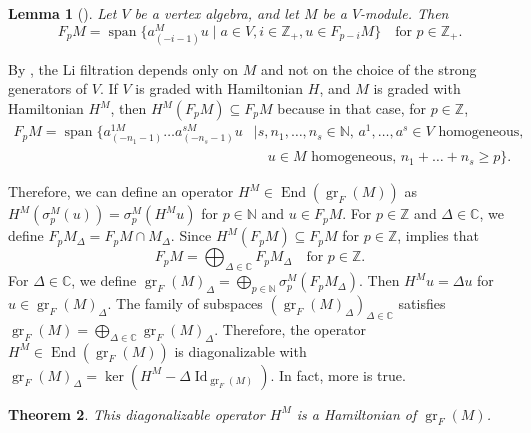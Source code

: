 \documentclass[a4paper, 12pt, reqno]{amsart}
\newtheorem{theorem}{Theorem}[section]
\newtheorem{lemma}[theorem]{Lemma}
\theoremstyle{remark}
\DeclareMathOperator{\Id}{Id}
\DeclareMathOperator{\gr}{gr}
\DeclareMathOperator{\End}{End}
\DeclareMathOperator{\vspan}{span}
\begin{document}
\begin{lemma}[{\cite[Lemma 2.9]{li_abelianizing_2005}}]
  \label{lmm:24}
  Let $V$ be a vertex algebra, and let $M$ be a $V$-module.
  Then
  \begin{equation*}
    F_pM = \vspan\{a^M_{(-i - 1)}u \mid a \in V, i \in \mathbb{Z}_+, u \in F_{p - i}M\} \quad \text{for $p \in \mathbb{Z}_+$}.
  \end{equation*}
\end{lemma}

By , the Li filtration depends only on $M$ and not on the choice of the strong generators of $V$.
If $V$ is graded with Hamiltonian $H$, and $M$ is graded with Hamiltonian $H^M$, then $H^M(F_pM) \subseteq F_pM$ because in that case, for $p \in \mathbb{Z}$,
\begin{equation*}
  \begin{split}
    F_pM = \vspan\{a^{1M}_{(-n_1 - 1)}\dots a^{sM}_{(-n_s - 1)}u &\mid \text{$s, n_1, \dots, n_s \in \mathbb{N}$, $a^1, \dots, a^s \in V$ homogeneous,} \\
                                                                 &\quad \text{$u \in M$ homogeneous, $n_1 + \dots + n_s \ge p$}\}.
  \end{split}
\end{equation*}

Therefore, we can define an operator $H^M \in \End(\gr_F(M))$ as $H^M(\sigma^M_p(u)) = \sigma^M_p(H^Mu)$ for $p \in \mathbb{N}$ and $u \in F_pM$.
For $p \in \mathbb{Z}$ and $\Delta \in \mathbb{C}$, we define $F_pM_{\Delta} = F_pM \cap M_{\Delta}$.
Since $H^M(F_pM) \subseteq F_pM$ for $p \in \mathbb{Z}$,  implies that
\begin{equation}
  \label{eq:44}
  F_pM = \bigoplus_{\Delta \in \mathbb{C}}F_pM_{\Delta} \quad \text{for $p \in \mathbb{Z}$}.
\end{equation}
For $\Delta \in \mathbb{C}$, we define $\gr_F(M)_{\Delta} = \bigoplus_{p \in \mathbb{N}}\sigma^M_p(F_pM_{\Delta})$.
Then $H^Mu = \Delta u$ for $u \in \gr_F(M)_{\Delta}$.
The family of subspaces $(\gr_F(M)_{\Delta})_{\Delta \in \mathbb{C}}$ satisfies $\gr_F(M) = \bigoplus_{\Delta \in \mathbb{C}}\gr_F(M)_{\Delta}$.
Therefore, the operator $H^M \in \End(\gr_F(M))$ is diagonalizable with $\gr_F(M)_{\Delta} = \ker(H^M - \Delta\Id_{\gr_F(M)})$.
In fact, more is true.

\begin{theorem}
  \label{thr:53}
  This diagonalizable operator $H^M$ is a Hamiltonian of $\gr_F(M)$.
\end{theorem}
\end{document}
